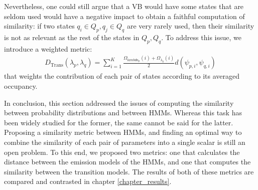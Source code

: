 \documentclass[../main.tex]{subfiles}
\begin{document}
\par Nevertheless, one could still argue that a VB would have some states that are seldom used would have a negative impact to obtain a faithful computation of similarity: if two states $q_i \in Q_p, q_j \in Q_q$ are very rarely used, then their similarity is not as relevant as the rest of the states in $Q_p, Q_q$. To address this issue, we introduce a weighted metric:
\begin{align*}
D_{\text{Trans}}(\lambda_p, \lambda_q) = \sum_{i=1}^K \frac{\Omega_{lambda_p}(i) + \Omega_{\lambda_q}(i)}{2} d(\psi_{p, i}, \psi_{q, i})
\end{align*}
that weights the contribution of each pair of states according to its averaged occupancy.
\par In conclusion, this section addressed the issues of computing the similarity between probability distributions and between HMMs. Whereas this task has been widely studied for the former, the same cannot be said for the latter. Proposing a similarity metric between HMMs, and finding an optimal way to combine the similarity of each pair of parameters into a single scalar is still an open problem. To this end, we proposed two metrics: one that calculates the distance between the emission models of the HMMs, and one that computes the similarity between the transition models. The results of both of these metrics are compared and contrasted in chapter \ref{chapter_results}.
\end{document}
